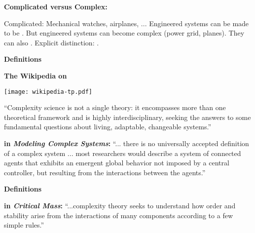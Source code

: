   \textbf{Complicated versus Complex:}
    
      Complicated: Mechanical watches, airplanes, ...
      Engineered systems can be made to be .
      But engineered systems can become complex (power grid, planes).
      They can also .
      Explicit distinction: .
    
  



  \textbf{Definitions}

  \textbf{
    The Wikipedia on 
    \hfill
  }

  \begin{marginfigure}[]
    \texttt{[image: wikipedia-tp.pdf]} 
  \end{marginfigure}

  ``Complexity science is not a single theory: 
  it encompasses more than one theoretical framework and is highly
  interdisciplinary, seeking the answers to some fundamental questions
  about living, adaptable, changeable systems.''
  

  \textbf{
     in \textit{Modeling Complex Systems}:}\cite{boccara2004a}
  ``... there is no universally accepted definition
  of a complex system ... most researchers would describe
  a system of connected agents that exhibits
  an emergent global behavior not imposed by a central
  controller, but resulting from the interactions between
  the agents.''
  




  \textbf{Definitions}

  \textbf{ in \textit{Critical Mass}:}\cite{ball2004a}
    ``...complexity theory seeks to understand how order and 
    stability arise from the interactions of many components
    according to a few simple rules.''
  




